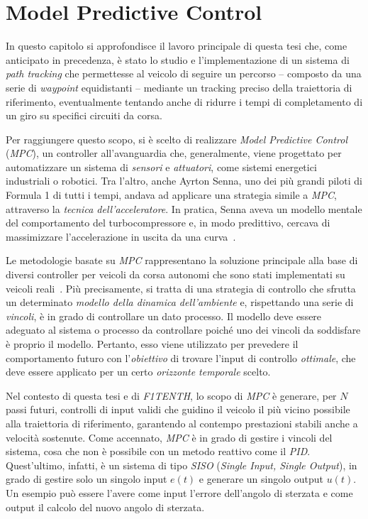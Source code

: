 \chapter{Model Predictive Control}
\label{chap:chap3}

In questo capitolo si approfondisce il lavoro principale di questa tesi che,
come anticipato in precedenza, è stato lo studio e l'implementazione di un sistema
di \textit{path tracking} che permettesse al veicolo di seguire
un percorso -- composto da una serie di \textit{waypoint} equidistanti -- mediante 
un tracking preciso della traiettoria di riferimento, eventualmente tentando anche di 
ridurre i tempi di completamento di un giro su specifici circuiti da corsa.

Per raggiungere questo scopo, si è scelto di realizzare 
\textit{Model Predictive Control} (\textit{MPC}), 
un controller all’avanguardia che, generalmente, viene progettato per 
automatizzare un sistema di \textit{sensori} e \textit{attuatori},
come sistemi energetici industriali o robotici.
Tra l'altro, anche Ayrton Senna, uno dei più grandi piloti di Formula 1 
di tutti i tempi, andava ad applicare una strategia simile a \textit{MPC}, attraverso la 
\textit{tecnica dell’acceleratore}. In pratica, Senna aveva un modello mentale del 
comportamento del turbocompressore e, in modo predittivo, cercava di massimizzare 
l’accelerazione in uscita da una curva~\cite{f1tenthcoursel13}.

Le metodologie basate su \textit{MPC} rappresentano la soluzione principale alla base di 
diversi controller per veicoli da corsa autonomi che sono stati implementati su veicoli reali~\cite{Betz2022}.
Più precisamente, si tratta di una strategia di controllo che sfrutta un 
determinato \textit{modello della dinamica dell’ambiente} e, rispettando una serie di 
\textit{vincoli}, è in grado di controllare un dato processo. 
Il modello deve essere adeguato al sistema o processo da controllare poiché uno
dei vincoli da soddisfare è proprio il modello. Pertanto, esso viene utilizzato per 
prevedere il comportamento futuro con l'\textit{obiettivo} di trovare l'input di controllo 
\textit{ottimale}, che deve essere applicato per un certo \textit{orizzonte temporale} scelto.

Nel contesto di questa tesi e di \textit{F1TENTH}, lo scopo di \textit{MPC} è generare,
per $N$ passi futuri, controlli di input validi che guidino il veicolo il più vicino 
possibile alla traiettoria di riferimento, garantendo al contempo prestazioni stabili anche a 
velocità sostenute.
Come accennato, \textit{MPC} è in grado di gestire i vincoli del sistema, cosa che non è 
possibile con un metodo reattivo come il \textit{PID}. Quest'ultimo, infatti, è un sistema
di tipo \textit{SISO} (\textit{Single Input, Single Output}), in grado di gestire
solo un singolo input $e(t)$ e generare un singolo output $u(t)$. Un esempio può essere 
l'avere come input l'errore dell'angolo di sterzata e come output il calcolo del nuovo angolo di sterzata.

